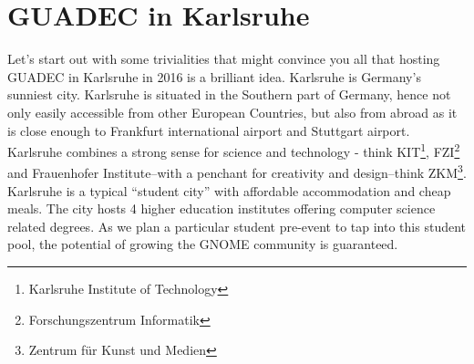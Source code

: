 
\section{GUADEC in Karlsruhe}

Let's start out with some trivialities that might convince you all that 
hosting GUADEC in Karlsruhe in 2016 is a brilliant idea. Karlsruhe is 
Germany's sunniest city. Karlsruhe is situated in the Southern part of 
Germany, hence not only easily accessible from other European 
Countries, but also from abroad as it is close enough to Frankfurt 
international airport and Stuttgart airport. Karlsruhe combines a 
strong sense for science and technology - think KIT\footnote{Karlsruhe 
Institute of Technology}, FZI\footnote{Forschungszentrum Informatik} 
and Frauenhofer Institute–with a penchant for creativity and 
design–think ZKM\footnote{Zentrum für Kunst und Medien}. Karlsruhe is a 
typical “student city” with affordable accommodation and cheap meals. 
The city hosts 4 higher education institutes offering computer science 
related degrees. As we plan a particular student pre-event to tap into 
this student pool, the potential of growing the GNOME community is 
guaranteed.


\vfill


\newpage
